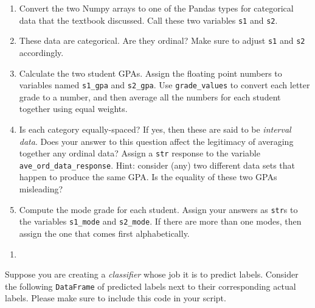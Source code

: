 \documentclass[12pt,krantz2]{krantz}
\providecommand{\tightlist}{%
  \setlength{\itemsep}{0pt}\setlength{\parskip}{0pt}}
\begin{document}
\begin{enumerate}
\def\labelenumi{\alph{enumi})}
\tightlist
\item
  Convert the two Numpy arrays to one of the Pandas types for categorical data that the textbook discussed. Call these two variables \texttt{s1} and \texttt{s2}.
\item
  These data are categorical. Are they ordinal? Make sure to adjust \texttt{s1} and \texttt{s2} accordingly.
\item
  Calculate the two student GPAs. Assign the floating point numbers to variables named \texttt{s1\_gpa} and \texttt{s2\_gpa}. Use \texttt{grade\_values} to convert each letter grade to a number, and then average all the numbers for each student together using equal weights.
\item
  Is each category equally-spaced? If yes, then these are said to be \emph{interval data}. Does your answer to this question affect the legitimacy of averaging together any ordinal data? Assign a \texttt{str} response to the variable \texttt{ave\_ord\_data\_response}. Hint: consider (any) two different data sets that happen to produce the same GPA. Is the equality of these two GPAs misleading?
\item
  Compute the mode grade for each student. Assign your answers as \texttt{str}s to the variables \texttt{s1\_mode} and \texttt{s2\_mode}. If there are more than one modes, then assign the one that comes first alphabetically.
\end{enumerate}

\begin{enumerate}
\def\labelenumi{\arabic{enumi}.}
\setcounter{enumi}{1}
\item
\end{enumerate}

Suppose you are creating a \emph{classifier} whose job it is to predict labels. Consider the following \texttt{DataFrame} of predicted labels next to their corresponding actual labels. Please make sure to include this code in your script.
\end{document}
